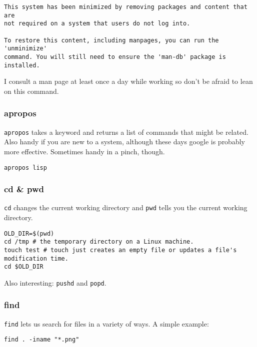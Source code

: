 \documentclass[11pt]{article}
\begin{document}
\begin{verbatim}
This system has been minimized by removing packages and content that are
not required on a system that users do not log into.

To restore this content, including manpages, you can run the 'unminimize'
command. You will still need to ensure the 'man-db' package is installed.
\end{verbatim}

I consult a man page at least once a day while working so don't be
afraid to lean on this command.

\subsubsection{apropos}
\label{sec:orga7980be}

\texttt{apropos} takes a keyword and returns a list of commands that might be
related. Also handy if you are new to a system, although these days
google is probably more effective. Sometimes handy in a pinch, though.

\begin{verbatim}
apropos lisp
\end{verbatim}

\subsubsection{cd \& pwd}
\label{sec:org1c1872e}

\texttt{cd} changes the current working directory and \texttt{pwd} tells you the
current working directory.

\begin{verbatim}
OLD_DIR=$(pwd)
cd /tmp # the temporary directory on a Linux machine.
touch test # touch just creates an empty file or updates a file's modification time.
cd $OLD_DIR
\end{verbatim}

Also interesting: \texttt{pushd} and \texttt{popd}.

\subsubsection{find}
\label{sec:org5e3ae75}

\texttt{find} lets us search for files in a variety of ways. A simple
example:

\begin{verbatim}
find . -iname "*.png"
\end{verbatim}
\end{document}
